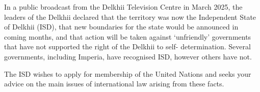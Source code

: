 \begin{tutorialquestion}
    \vspace{\baselineskip}

    In a public broadcast from the Delkhii Television Centre in March 2025, the leaders of the
    Delkhii declared that the territory was now the Independent State of Delkhii (ISD), that new
    boundaries for the state would be announced in coming months, and that action will be taken
    against `unfriendly' governments that have not supported the right of the Delkhii to self-
    determination. Several governments, including Imperia, have recognised ISD, however others
    have not.

    \vspace{\baselineskip}

    The ISD wishes to apply for membership of the United Nations and seeks your advice on the
    main issues of international law arising from these facts.
    
\end{tutorialquestion}

